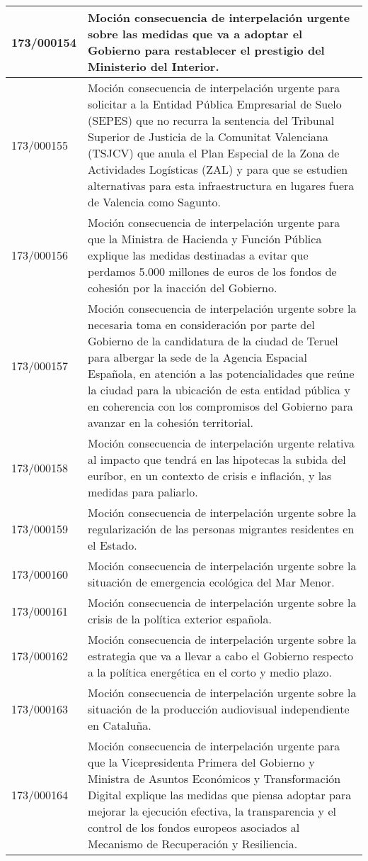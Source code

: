 {\begin{table}[H]
\begin{center}
\begin{tabularx}{\linewidth}{| l | X |}
\hline
173/000154 & Moción consecuencia de interpelación urgente sobre las medidas que va a adoptar el Gobierno para restablecer el prestigio del Ministerio del Interior. \\
\hline
173/000155 & Moción consecuencia de interpelación urgente para solicitar a la Entidad Pública Empresarial de Suelo (SEPES) que no recurra la sentencia del Tribunal Superior de Justicia de la Comunitat Valenciana (TSJCV) que anula el Plan Especial de la Zona de Actividades Logísticas (ZAL) y para que se estudien alternativas para esta infraestructura en lugares fuera de Valencia como Sagunto. \\
\hline
173/000156 & Moción consecuencia de interpelación urgente para que la Ministra de Hacienda y Función Pública explique las medidas destinadas a evitar que perdamos 5.000 millones de euros de los fondos de cohesión por la inacción del Gobierno. \\
\hline
173/000157 & Moción consecuencia de interpelación urgente sobre la necesaria toma en consideración por parte del Gobierno de la candidatura de la ciudad de Teruel para albergar la sede de la Agencia Espacial Española, en atención a las potencialidades que reúne la ciudad para la ubicación de esta entidad pública y en coherencia con los compromisos del Gobierno para avanzar en la cohesión territorial. \\
\hline
173/000158 & Moción consecuencia de interpelación urgente relativa al impacto que tendrá en las hipotecas la subida del euríbor, en un contexto de crisis e inflación, y las medidas para paliarlo. \\
\hline
173/000159 & Moción consecuencia de interpelación urgente sobre la regularización de las personas migrantes residentes en el Estado. \\
\hline
173/000160 & Moción consecuencia de interpelación urgente sobre la situación de emergencia ecológica del Mar Menor. \\
\hline
173/000161 & Moción consecuencia de interpelación urgente sobre la crisis de la política exterior española. \\
\hline
173/000162 & Moción consecuencia de interpelación urgente sobre la estrategia que va a llevar a cabo el Gobierno respecto a la política energética en el corto y medio plazo. \\
\hline
173/000163 & Moción consecuencia de interpelación urgente sobre la situación de la producción audiovisual independiente en Cataluña. \\
\hline
173/000164 & Moción consecuencia de interpelación urgente para que la Vicepresidenta Primera del Gobierno y Ministra de Asuntos Económicos y Transformación Digital explique las medidas que piensa adoptar para mejorar la ejecución efectiva, la transparencia y el control de los fondos europeos asociados al Mecanismo de Recuperación y Resiliencia. \\

\end{tabularx}
\end{center}
\end{table}}

